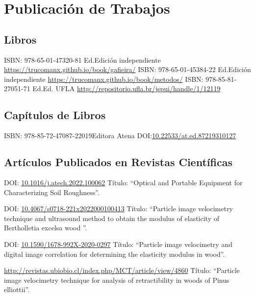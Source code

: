 \documentclass[11pt,a4paper,sans]{moderncv} %
\newcommand{\doiurl}[1]{\href{https://doi.org/#1}{#1}}
\begin{document}
\section{Publicación de Trabajos}
\subsection{Libros}
	      {ISBN: 978-65-01-47320-8}{1 Ed.}{Edición independiente}
	      {\url{https://trucomanx.github.io/book/gafieira/}}
	      {ISBN: 978-65-01-45384-2}{2 Ed.}{Edición independiente}
	      {\url{https://trucomanx.github.io/book/metodos/}}
	      {ISBN: 978-85-81-27051-7}{1 Ed.}{Ed. UFLA}
	      {\url{http://repositorio.ufla.br/jspui/handle/1/12119}}

\subsection{Capítulos de Libros}
	      {ISBN: 978-85-72-47087-2}{2019}{Editora Atena}
	      {DOI:\doiurl{10.22533/at.ed.87219310127}}

\subsection{Artículos Publicados en Revistas Científicas}

	      {DOI: \doiurl{10.1016/j.atech.2022.100062} }{}{}
	      {Título: ``Optical and Portable Equipment for Characterizing Soil Roughness''.}
	      
	      {DOI: \doiurl{10.4067/s0718-221x2022000100413} }{}{}
	      {Título: ``Particle image velocimetry technique and ultrasound method to obtain the modulus of elasticity of Bertholletia excelsa wood ''.}
	      
	      {DOI: \doiurl{10.1590/1678-992X-2020-0297} }{}{}
	      {Título: ``Particle image velocimetry and digital image correlation for determining the elasticity modulus in wood''.}
	      
	      {\url{http://revistas.ubiobio.cl/index.php/MCT/article/view/4860}}{}{}
	      {Título: ``Particle image velocimetry technique for analysis of retractibility in woods of Pinus elliottii''.}
	      
\end{document}
